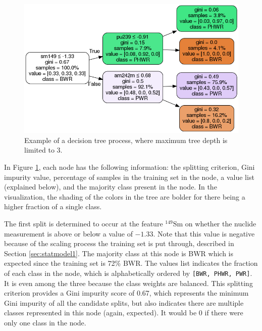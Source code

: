 \begin{figure}[!htb]
  \centering
  \includegraphics[width=\linewidth]{./chapters/litrev/dtree.png}
  \caption[Example of a decision tree]
          {Example of a decision tree process, where maximum tree depth is 
           limited to 3.}
  \label{fig:dtr}
\end{figure}

In Figure \ref{fig:dtr}, each node has the following information: the splitting
criterion, Gini impurity value, percentage of samples in the training set in
the node, a value list (explained below), and the majority class present in the
node.  In the visualization, the shading of the colors in the tree are bolder
for there being a higher fraction of a single class.

The first split is determined to occur at the feature ${}^{149}\text{Sm}$ on
whether the nuclide measurement is above or below a value of $-1.33$. Note that
this value is negative because of the scaling process the training set is put
through, described in Section \ref{sec:statmodel1}.  The majority class at this
node is \gls{BWR} which is expected since the training set is 72\% \gls{BWR}.
The values list indicates the fraction of each class in the node, which is
alphabetically ordered by \texttt{[BWR, PHWR, PWR]}. It is even among the three
because the class weights are balanced.  This splitting criterion provides a
Gini impurity score of 0.67, which represents the minimum Gini impurity of all
the candidate splits, but also indicates there are multiple classes represented
in this node (again, expected).  It would be 0 if there were only one class in
the node.  

